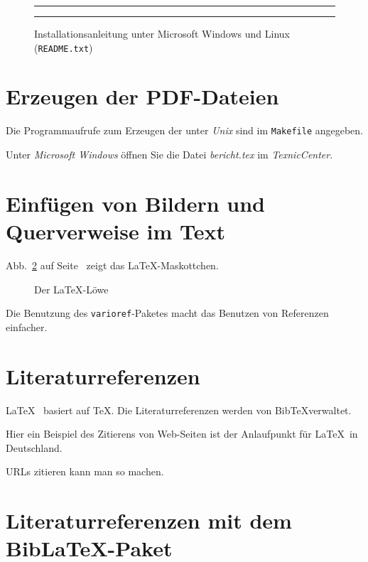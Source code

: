\begin{figure}[h]
  \centering
  \hrule
  \caption{Installationsanleitung unter Microsoft Windows und Linux (\texttt{README.txt})}
  \label{fig-readme}
  \hrule
\end{figure}


\section{Erzeugen der PDF-Dateien}

Die Programmaufrufe zum Erzeugen der  unter \emph{Unix}
sind im \texttt{Makefile} angegeben.

Unter \emph{Microsoft Windows} öffnen Sie die Datei \emph{bericht.tex} im \emph{TexnicCenter}.

\section{Einfügen von Bildern und Querverweise im Text}


Abb.~\ref{fig-loewe} auf Seite~\pageref{fig-loewe} zeigt das \LaTeX-Maskottchen.
\begin{figure}[htbp]
\centering
\caption{\label{fig-loewe}Der \LaTeX-Löwe}
\end{figure}

Die Benutzung des \texttt{varioref}-Paketes macht das Benutzen von Referenzen einfacher.


\section{Literaturreferenzen}

\LaTeX\ \cite{lamport.1995a} basiert auf \TeX \cite{knuth.1984a}.
Die Literaturreferenzen werden von Bib\TeX verwaltet.

Hier ein Beispiel des Zitierens von Web-Seiten
\cite{dante.2010a} ist der Anlaufpunkt für \LaTeX\ in Deutschland.

URLs zitieren kann man so \cite{dante.2010a} machen.

\section{Literaturreferenzen mit dem Bib\LaTeX-Paket}

